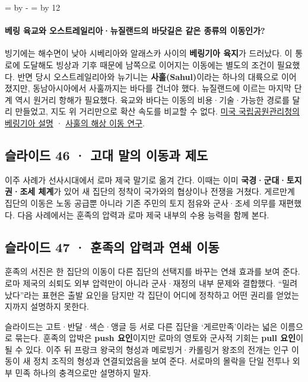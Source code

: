 \documentclass[10pt,a4paper]{article}
\newcommand{\ReserveQuestionSpace}{%
  \par\begingroup
  \dimen0=\pagegoal \advance\dimen0 by -\pagetotal
  \dimen2=\baselineskip \multiply\dimen2 by 12
  \ifdim\dimen0<\dimen2 \newpage\fi
  \endgroup}
\begin{document}
\ReserveQuestionSpace
\paragraph{베링 육교와 오스트레일리아·뉴질랜드의 바닷길은 같은 종류의 이동인가?}
빙기에는 해수면이 낮아 시베리아와 알래스카 사이의 \textbf{베링기아 육지}가 드러났다. 이 통로에 도달해도 빙상과 기후 때문에 남쪽으로 이어지는 이동에는 별도의 조건이 필요했다. 반면 당시 오스트레일리아와 뉴기니는 \textbf{사훌(Sahul)}이라는 하나의 대륙으로 이어졌지만, 동남아시아에서 사훌까지는 바다를 건너야 했다. 뉴질랜드에 이르는 마지막 단계 역시 원거리 항해가 필요했다. 육교와 바다는 이동의 비용·기술·가능한 경로를 달리 만들었고, 지도 위 거리만으로 확산 속도를 비교할 수 없다. \href{https://www.nps.gov/subjects/beringia/about.htm}{미국 국립공원관리청의 베링기아 설명} · \href{https://www.nature.com/articles/s41598-019-42946-9}{사훌의 해상 이동 연구}.\par

\subsection{슬라이드 46 · 고대 말의 이동과 제도}
이주 사례가 선사시대에서 로마 제국 말기로 옮겨 간다. 이때는 이미 \textbf{국경·군대·토지권·조세 체계}가 있어 새 집단의 정착이 국가와의 협상이나 전쟁을 거쳤다. 게르만계 집단의 이동은 노동 공급뿐 아니라 기존 주민의 토지 점유와 군사·조세 의무를 재편했다. 다음 사례에서는 훈족의 압력과 로마 제국 내부의 수용 능력을 함께 본다.\par

\subsection{슬라이드 47 · 훈족의 압력과 연쇄 이동}
훈족의 서진은 한 집단의 이동이 다른 집단의 선택지를 바꾸는 연쇄 효과를 보여 준다. 로마 제국의 쇠퇴도 외부 압력만이 아니라 군사·재정의 내부 문제와 결합했다. “밀려났다”라는 표현은 출발 요인을 담지만 각 집단이 어디에 정착하고 어떤 권리를 얻었는지까지 설명하지 못한다.\par

슬라이드는 고트·반달·색슨·앵글 등 서로 다른 집단을 ‘게르만족’이라는 넓은 이름으로 묶는다. 훈족의 압박은 \textbf{push 요인}이지만 로마의 영토와 군사적 기회는 \textbf{pull 요인}이 될 수 있다. 이주 뒤 프랑크 왕국의 형성과 메로빙거·카롤링거 왕조의 전개는 인구 이동이 새 정치 조직의 형성과 연결되었음을 보여 준다. 서로마의 몰락을 단일 전투나 외부 민족 하나의 충격으로만 설명하지 말자.\par
\end{document}
